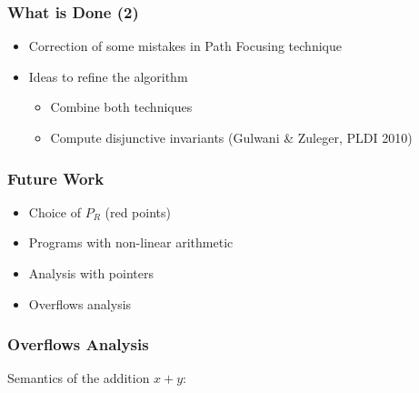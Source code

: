 \documentclass{beamer}
\begin{document}
\begin{frame}
\frametitle{What is Done (2)}

\begin{itemize}
\item Correction of some mistakes in Path Focusing technique
\item Ideas to refine the algorithm
\begin{itemize}
\item Combine both techniques
\item Compute disjunctive invariants (Gulwani \& Zuleger, PLDI 2010)
\end{itemize}
\end{itemize}
\end{frame}

\begin{frame}
  \frametitle{Future Work}
\begin{itemize}
\item Choice of $P_R$ (red points)
\item Programs with non-linear arithmetic
\item Analysis with pointers
\item Overflows analysis
\end{itemize}
\end{frame}


\begin{frame}
\frametitle{Overflows Analysis}
Semantics of the addition $x+y$:
\begin{center}
\end{center}
\end{frame}
\end{document}
